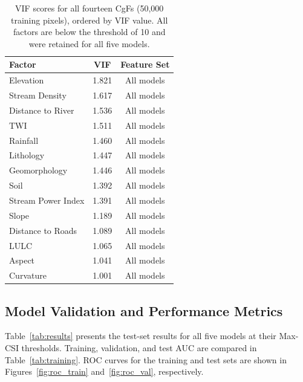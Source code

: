 \documentclass[12pt, a4paper]{article}
\begin{document}
\begin{table}[H]
\centering
\caption{VIF scores for all fourteen CgFs (50,000 training pixels), ordered by VIF value. All factors are below the threshold of 10 and were retained for all five models.}
\label{tab:vif}
\small
\begin{tabular}{lcc}
\toprule
\textbf{Factor} & \textbf{VIF} & \textbf{Feature Set} \\
\midrule
Elevation          & 1.821 & All models \\
Stream Density     & 1.617 & All models \\
Distance to River  & 1.536 & All models \\
TWI                & 1.511 & All models \\
Rainfall           & 1.460 & All models \\
Lithology          & 1.447 & All models \\
Geomorphology      & 1.446 & All models \\
Soil               & 1.392 & All models \\
Stream Power Index & 1.391 & All models \\
Slope              & 1.189 & All models \\
Distance to Roads  & 1.089 & All models \\
LULC               & 1.065 & All models \\
Aspect             & 1.041 & All models \\
Curvature          & 1.001 & All models \\
\bottomrule
\end{tabular}
\end{table}

\subsection{Model Validation and Performance Metrics}

Table~\ref{tab:results} presents the test-set results for all five models at their Max-CSI thresholds. Training, validation, and test AUC are compared in Table~\ref{tab:training}. ROC curves for the training and test sets are shown in Figures~\ref{fig:roc_train} and~\ref{fig:roc_val}, respectively.
\end{document}
